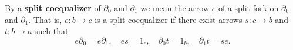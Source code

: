 By a \textbf{split coequalizer} of $\partial_0$ and $\partial_1$ we mean the arrow $e$ of a split fork on $\partial_0$ and $\partial_1$. That is, $e: b \to c$ is a split coequalizer if there exist arrows $s: c \to b$ and $t: b \to a$ such that
$$e \partial_0 = e \partial_1, \quad es = 1_c, \quad \partial_0 t = 1_b, \quad \partial_1 t = se.$$
